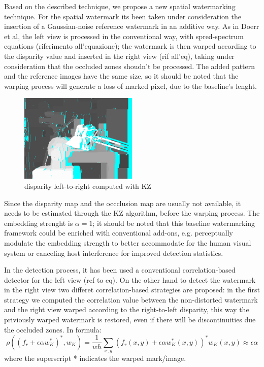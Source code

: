 Based on the described technique, we propose a new spatial watermarking technique. \newline
For the spatial watermark its been taken under consideration the insertion of a Gaussian-noise reference watermark in an additive way.\newline
As in Doerr et al, the left view is processed in the conventional way, with spred-spectrum equations (riferimento all'equazione); the watermark is then warped according to the disparity value and inserted in the right view (rif all'eq), taking under consideration that the occluded zones shoudn't be processed.\newline
The added pattern and the reference images have the same size, so it should be noted that the warping process will generate a loss of marked pixel, due to the baseline's lenght.\newline
\begin{figure}[h!]
\centering
\includegraphics[width=0.5\textwidth]{./img/disp_left_to_right.png}
\caption{\small{disparity left-to-right computed with KZ}}
\label{fig:kzdisplr}
\end{figure}
Since the disparity map and the occclusion map are usually not available, it needs to be estimated through the KZ algorithm, before the warping process.\newline
The embedding strenght is $\alpha=1$; it should be noted that this baseline watermarking framework could be enriched with conventional add-ons, e.g. perceptually modulate the embedding strength to better accommodate for the human visual system or canceling host interference for improved detection statistics.\newline

In the detection process, it has been used a conventional correlation-based detector for the left view (ref to eq).\newline 
On the other hand to detect the watermark in the right view two differet correlation-based strategies are proposed:
in the first strategy we computed the correlation value between the non-distorted watermark and the right view warped according to the right-to-left disparity, this way the priviously warped watermark is restored, even if there will be discontinuities due the occluded zones. In formula:
$$\rho((f_{r}+\epsilon\alpha w_{K}^{*})^{*},w_{K})= \frac{1}{wh}\sum_{x,y}(f_{r}(x,y)+\epsilon\alpha w_{K}^{*}(x,y))^{*}w_{K}(x,y)\approx\epsilon\alpha $$
where the superscript * indicates the warped mark/image.\newline

